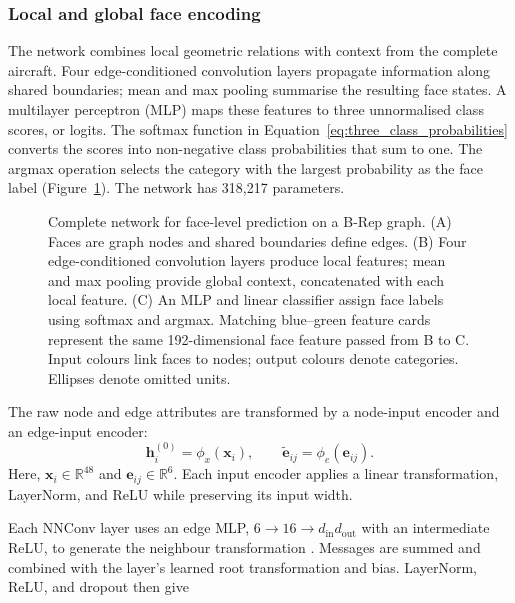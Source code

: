 \documentclass[12pt,a4paper]{article}
\begin{document}
\subsubsection{Local and global face encoding}\label{sec:three_class_gnn}

The network combines local geometric relations with context from the complete aircraft. Four edge-conditioned convolution layers propagate information along shared boundaries; mean and max pooling summarise the resulting face states. A multilayer perceptron (MLP) maps these features to three unnormalised class scores, or logits. The softmax function in Equation~\ref{eq:three_class_probabilities} converts the scores into non-negative class probabilities that sum to one. The argmax operation selects the category with the largest probability as the face label (Figure~\ref{fig:three_class_gnn}). The network has 318,217 parameters.

\begin{figure}[!t]
\centering

\caption{Complete network for face-level prediction on a B-Rep graph. (A) Faces are graph nodes and shared boundaries define edges. (B) Four edge-conditioned convolution layers produce local features; mean and max pooling provide global context, concatenated with each local feature. (C) An MLP and linear classifier assign face labels using softmax and argmax. Matching blue--green feature cards represent the same 192-dimensional face feature passed from B to C. Input colours link faces to nodes; output colours denote categories. Ellipses denote omitted units.}\label{fig:three_class_gnn}
\end{figure}

The raw node and edge attributes are transformed by a node-input encoder and an edge-input encoder:
\begin{equation}
\mathbf{h}_{i}^{(0)}=\phi_x(\mathbf{x}_i), \qquad
\tilde{\mathbf{e}}_{ij}=\phi_e(\mathbf{e}_{ij}).
\label{eq:shared_input_encoding}
\end{equation}
Here, $\mathbf{x}_i\in\mathbb{R}^{48}$ and $\mathbf{e}_{ij}\in\mathbb{R}^{6}$. Each input encoder applies a linear transformation, LayerNorm, and ReLU while preserving its input width.

Each NNConv layer uses an edge MLP, $6\rightarrow16\rightarrow d_{\mathrm{in}}d_{\mathrm{out}}$ with an intermediate ReLU, to generate the neighbour transformation \parencite{simonovsky2017dynamic}. Messages are summed and combined with the layer's learned root transformation and bias. LayerNorm, ReLU, and dropout then give
\end{document}
